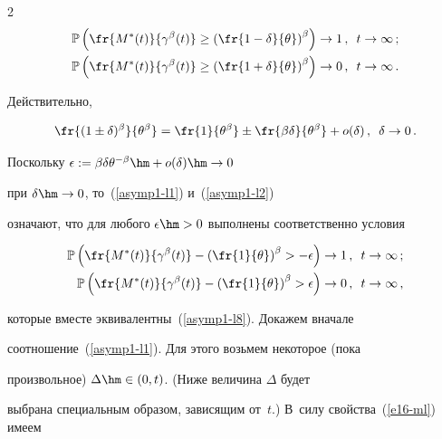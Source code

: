 \begin{multicols}{2}
\begin{align}
\mathbb{P} \left( \fr{M^*(t)}{\gamma^\beta(t)} \geq \left(


\fr{1-\delta}{\theta} \right)^\beta \right ) & \to 1\,,\enskip t \to


\infty \,; \label{asymp1-l1}\\


\mathbb{P} \left( \fr{M^*(t)}{\gamma^\beta(t)} \geq \left(


\fr{1+\delta}{\theta} \right)^\beta \right) &\to 0\,,\enskip t \to


\infty\,. \label{asymp1-l2}


\end{align}


Действительно,


$$


\fr{(1\pm \delta)^\beta}{{\theta}^\beta}=\fr{1}{{\theta}^\beta}\pm


\fr{\beta \delta}{{\theta}^\beta}+o(\delta)\,,\enskip  \delta \to 0\,.


$$


Поскольку $\epsilon :=\beta \delta\theta^{-\beta}\hm+o(\delta)\hm\to 0$   


при  $\delta\hm\to 0$, то~(\ref{asymp1-l1}) и~(\ref{asymp1-l2})


означают, что для любого $\epsilon\hm>0$ выполнены соответственно условия


\begin{align*}


\mathbb{P} \left(\fr{M^*(t)}{\gamma^\beta(t)}-\left(


\fr{1}{\theta}\right)^\beta > -\epsilon \right ) & \to 1\,,\enskip t \to \infty\,;\\


\mathbb{P} \left(\fr{M^*(t)}{\gamma^\beta(t)}-\left(


\fr{1}{\theta}\right)^\beta > \epsilon \right ) &\to 0\,,\enskip t \to \infty\,,


\end{align*}


которые вместе эквивалентны~(\ref{asymp1-l8}). Докажем вначале


соотношение~(\ref{asymp1-l1}). Для этого возьмем некоторое (пока


произвольное) $\Delta \hm\in (0,t)$. (Ниже величина $\Delta$ будет


выбрана специальным образом, зависящим от~$t$.) В~силу свойства~(\ref{e16-ml}) имеем


\begin{multline}



\end{multline}
\end{multicols}
